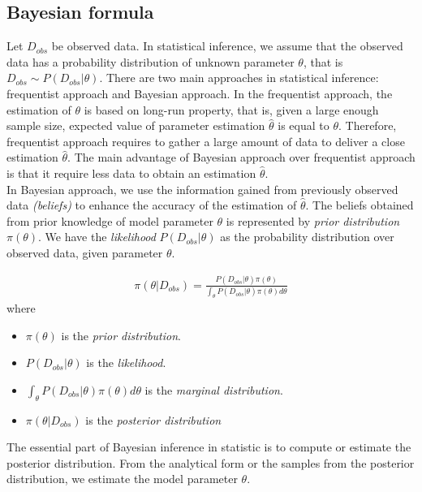 \subsection{Bayesian formula}
Let $D_{obs}$ be observed data. In statistical inference, we assume that the observed data has a
probability distribution of unknown parameter $\theta$, that is $D_{obs} \sim P(D_{obs}|\theta)$.
There are two main approaches in statistical inference: frequentist approach and Bayesian approach.
In the frequentist approach, the estimation of $\theta$ is based on long-run property, that is, given a
large enough sample size, expected value of parameter estimation $\hat{\theta}$ is equal to
$\theta$. Therefore, frequentist approach requires to gather a large amount of data to deliver a
close estimation $\hat{\theta}$.  The main advantage of Bayesian approach over frequentist approach
is that it require less data to obtain an estimation $\hat{\theta}$.\\
In Bayesian approach, we use the information gained from previously observed data \textit{(beliefs)}
to enhance the accuracy of the estimation of $\hat{\theta}$. The beliefs obtained from prior
knowledge of model parameter $\theta$ is represented by \textit{prior distribution} $\pi(\theta)$.
We have the \textit{likelihood} $P(D_{obs}|\theta)$ as the probability distribution over observed
data, given parameter $\theta$.
\begin{definition}
    \rm
    \begin{align*}
        \pi(\theta | D_{obs}) = \frac{P(D_{obs}|\theta)\pi(\theta)}{\int_\theta P(D_{obs}|\theta)\pi(\theta)d\theta}
    \end{align*}
    where
    \begin{itemize}
        \item $\pi(\theta)$ is the \textit{prior distribution}.
        \item $P(D_{obs}|\theta)$ is the \textit{likelihood}.
        \item $\int_\theta P(D_{obs}|\theta)\pi(\theta)d\theta$ is the \textit{marginal distribution}.
        \item $\pi(\theta | D_{obs})$ is the \textit{posterior distribution}
    \end{itemize}
\end{definition}
The essential part of Bayesian inference in statistic is to compute or estimate the posterior
distribution. From the analytical form or the samples from the posterior distribution, we estimate
the model parameter $\theta$.

